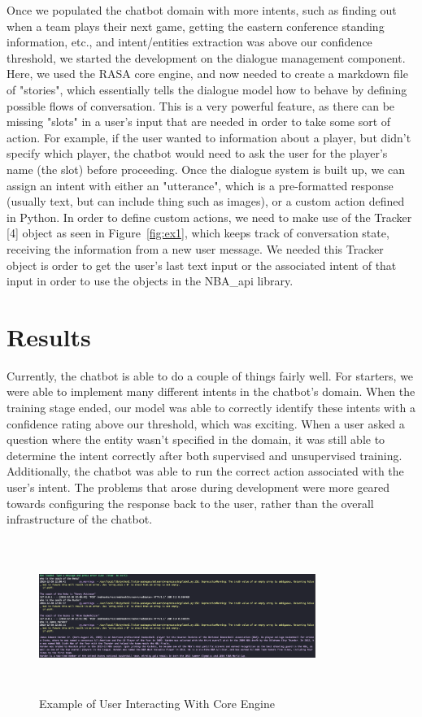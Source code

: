 \documentclass[conference]{IEEEtran}
\begin{document}
Once we populated the chatbot domain with more intents, such as finding out when a team plays their next game, getting the eastern conference standing information, etc., and intent/entities extraction was above our confidence threshold, we started the development on the dialogue management component. Here, we used the RASA core engine, and now needed to create a markdown file of "stories", which essentially tells the dialogue model how to behave by defining possible flows of conversation. This is a very powerful feature, as there can be missing "slots" in a user's input that are needed in order to take some sort of action. For example, if the user wanted to information about a player, but didn't specify which player, the chatbot would need to ask the user for the player's name (the slot) before proceeding. Once the dialogue system is built up, we can assign an intent with either an "utterance", which is a pre-formatted response (usually text, but can include thing such as images), or a custom action defined in Python. In order to define custom actions, we need to make use of the Tracker [4] object as seen in Figure~\ref{fig:ex1}, which keeps track of conversation state, receiving the information from a new user message. We needed this Tracker object is order to get the user's last text input or the associated intent of that input in order to use the objects in the NBA\_api library.

\section*{Results}
Currently, the chatbot is able to do a couple of things fairly well. For starters, we were able to implement many different intents in the chatbot's domain. When the training stage ended, our model was able to correctly identify these intents with a confidence rating above our threshold, which was exciting. When a user asked a question where the entity wasn't specified in the domain, it was still able to determine the intent correctly after both supervised and unsupervised training. Additionally, the chatbot was able to run the correct action associated with the user's intent. The problems that arose during development were more geared towards configuring the response back to the user, rather than the overall infrastructure of the chatbot.

\begin{figure}[!htb]
	\centering
	\includegraphics[width=9cm,height=5cm]{core_example.pdf}
	\caption{ Example of User Interacting With Core Engine }
	\label{fig:ex3}
\end{figure}
\end{document}
